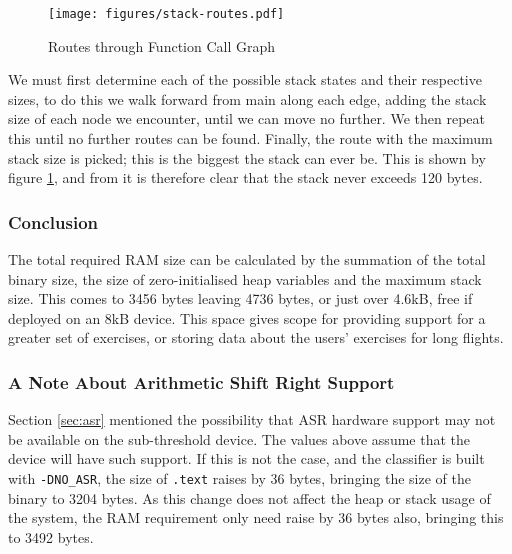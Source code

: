 \begin{figure}[!h]
    \centering
    \texttt{[image: figures/stack-routes.pdf]}
    \caption{Routes through Function Call Graph}
    \label{fig:stack-routes}
\end{figure}

We must first determine each of the possible stack states and their respective sizes, to do this we walk forward from main along each edge, adding the stack size of each node we encounter, until we can move no further. We then repeat this until no further routes can be found. Finally, the route with the maximum stack size is picked; this is the biggest the stack can ever be. This is shown by figure \ref{fig:stack-routes}, and from it is therefore clear that the stack never exceeds 120 bytes.

\clearpage
\subsubsection{Conclusion}

The total required RAM size can be calculated by the summation of the total binary size, the size of zero-initialised heap variables and the maximum stack size. This comes to 3456 bytes leaving 4736 bytes, or just over 4.6kB, free if deployed on an 8kB device. This space gives scope for providing support for a greater set of exercises, or storing data about the users' exercises for long flights.

\subsubsection{A Note About Arithmetic Shift Right Support}

Section \ref{sec:asr} mentioned the possibility that ASR hardware support may not be available on the sub-threshold device. The values above assume that the device will have such support. If this is not the case, and the classifier is built with \verb|-DNO_ASR|, the size of \verb|.text| raises by 36 bytes, bringing the size of the binary to 3204 bytes. As this change does not affect the heap or stack usage of the system, the RAM requirement only need raise by 36 bytes also, bringing this to 3492 bytes.
